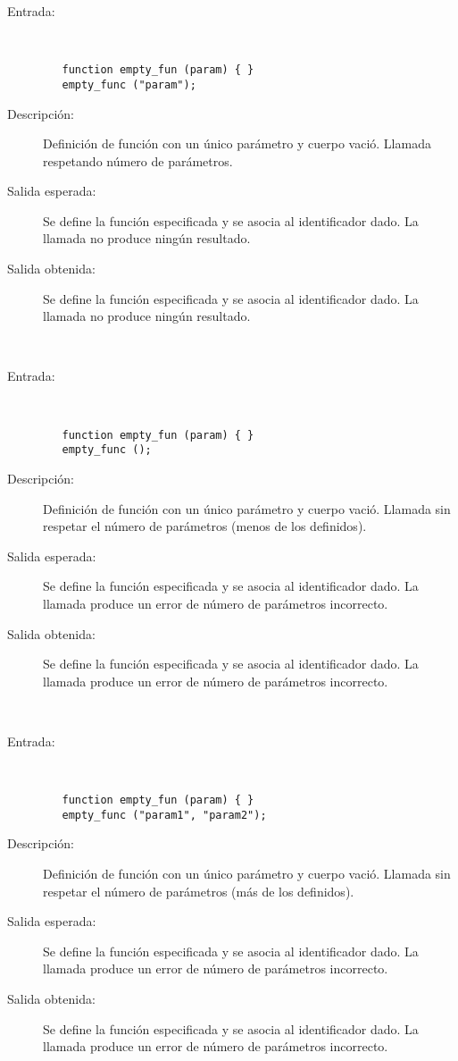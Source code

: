 	\begin{description}
		\item [Entrada:] \hfill \\
\begin{lstlisting}
   function empty_fun (param) { } 
   empty_func ("param");
\end{lstlisting}
		\item [Descripción:] Definición de función con un único parámetro y cuerpo vació. Llamada respetando número de parámetros.
		\item [Salida esperada:] Se define la función especificada y se asocia al identificador dado. La llamada no produce ningún resultado.
		\item [Salida obtenida:] Se define la función especificada y se asocia al identificador dado. La llamada no produce ningún resultado.
	\end{description}
\hfil \\
	\begin{description}
		\item [Entrada:] \hfill \\
\begin{lstlisting}
   function empty_fun (param) { } 
   empty_func ();
\end{lstlisting}
		\item [Descripción:] Definición de función con un único parámetro y cuerpo vació. Llamada sin respetar el número de parámetros (menos de los definidos).
		\item [Salida esperada:] Se define la función especificada y se asocia al identificador dado. La llamada produce un error de número de parámetros incorrecto.
		\item [Salida obtenida:] Se define la función especificada y se asocia al identificador dado. La llamada produce un error de número de parámetros incorrecto.
	\end{description}
\hfil \\
	\begin{description}
		\item [Entrada:] \hfill \\
\begin{lstlisting}
   function empty_fun (param) { } 
   empty_func ("param1", "param2");
\end{lstlisting}
		\item [Descripción:] Definición de función con un único parámetro y cuerpo vació. Llamada sin respetar el número de parámetros (más de los definidos).
		\item [Salida esperada:] Se define la función especificada y se asocia al identificador dado. La llamada produce un error de número de parámetros incorrecto.
		\item [Salida obtenida:] Se define la función especificada y se asocia al identificador dado. La llamada produce un error de número de parámetros incorrecto.
	\end{description}
